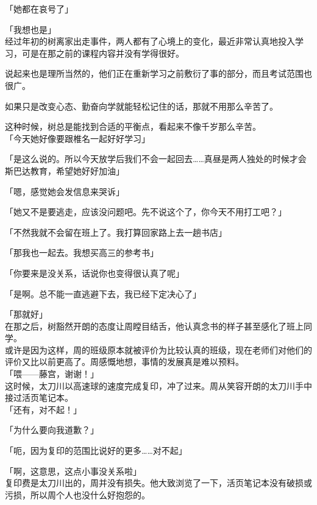 「她都在哀号了」

「我想也是」\\

经过年初的树离家出走事件，两人都有了心境上的变化，最近非常认真地投入学习，可是在那之前的课程内容并没有学得很好。

说起来也是理所当然的，他们正在重新学习之前敷衍了事的部分，而且考试范围也很广。

如果只是改变心态、勤奋向学就能轻松记住的话，那就不用那么辛苦了。

这种时候，树总是能找到合适的平衡点，看起来不像千岁那么辛苦。\\

「今天她好像要跟椎名一起好好学习」

「是这么说的。所以今天放学后我们不会一起回去……真昼是两人独处的时候才会斯巴达教育，希望她好好加油」

「嗯，感觉她会发信息来哭诉」

「她又不是要逃走，应该没问题吧。先不说这个了，你今天不用打工吧？」

「不然我就不会留在班上了。我打算回家路上去一趟书店」

「那我也一起去。我想买高三的参考书」

「你要来是没关系，话说你也变得很认真了呢」

「是啊。总不能一直逃避下去，我已经下定决心了」

「那就好」\\

在那之后，树豁然开朗的态度让周瞠目结舌，他认真念书的样子甚至感化了班上同学。\\

或许是因为这样，周的班级原本就被评价为比较认真的班级，现在老师们对他们的评价又比以前更高了。周感慨地想，事情的发展真是难以预料。\\

「喂——藤宫，谢谢！」\\

这时候，太刀川以高速球的速度完成复印，冲了过来。周从笑容开朗的太刀川手中接过活页笔记本。\\

「还有，对不起！」

「为什么要向我道歉？」

「呃，因为复印的范围比说好的更多……对不起」

「啊，这意思，这点小事没关系啦」\\

复印费是太刀川出的，周并没有损失。他大致浏览了一下，活页笔记本没有破损或污损，所以周个人也没什么好抱怨的。


